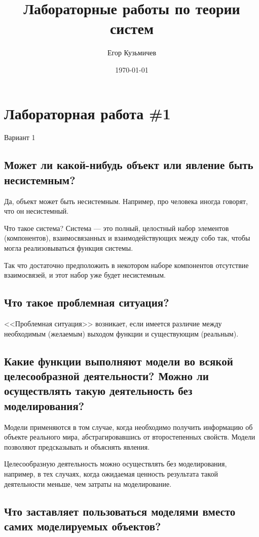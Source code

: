 \documentclass[a4paper,12pt]{article}
\author{Егор Кузьмичев}
\title{Лабораторные работы по теории систем}
\date{\today}
\begin{document}
\maketitle

\section{Лабораторная работа \#1}

Вариант 1

\subsection{Может ли какой-нибудь объект или явление быть несистемным?}

Да, объект может быть несистемным. Например, про человека иногда говорят, что он несистемный.

Что такое система? Система --- это полный, целостный набор элементов (компонентов), взаимосвязанных и взаимодействующих между собо так, чтобы могла реализовываться функция системы.

Так что достаточно предположить в некотором наборе компонентов отсутствие взаимосвязей, и этот набор уже будет несистемным.

\subsection{Что такое проблемная ситуация?}
<<Проблемная ситуация>> возникает, если имеется различие между необходимым (желаемым) выходом функции и существующим (реальным).

\subsection{Какие функции выполняют модели во всякой целесообразной деятельности? Можно ли осуществлять такую деятельность без моделирования?}

Модели применяются в том случае, когда необходимо получить информацию об объекте реального мира, абстрагировавшись от второстепенных свойств. Модели позволяют предсказывать и объяснять явления.

Целесообразную деятельность можно осуществлять без моделирования, например, в тех случаях, когда ожидаемая ценность результата такой деятельности меньше, чем затраты на моделирование.

\subsection{Что заставляет пользоваться моделями вместо самих моделируемых объектов?}
\end{document}
